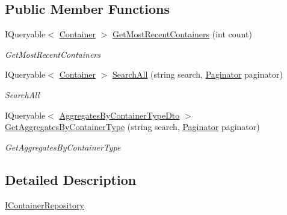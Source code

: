\subsection*{Public Member Functions}
\begin{DoxyCompactItemize}
\item 
I\+Queryable$<$ \mbox{\hyperlink{class_gtd_app_1_1_data_1_1_container}{Container}} $>$ \mbox{\hyperlink{interface_gtd_app_1_1_repository_1_1_interfaces_1_1_i_container_repository_ab1ca01a7ba1394f3a611fee57dc12646}{Get\+Most\+Recent\+Containers}} (int count)
\begin{DoxyCompactList}\small\item\em Get\+Most\+Recent\+Containers \end{DoxyCompactList}\item 
I\+Queryable$<$ \mbox{\hyperlink{class_gtd_app_1_1_data_1_1_container}{Container}} $>$ \mbox{\hyperlink{interface_gtd_app_1_1_repository_1_1_interfaces_1_1_i_container_repository_aa62fa4de64e7fa030d12aa6916d8231c}{Search\+All}} (string search, \mbox{\hyperlink{class_gtd_app_1_1_repository_1_1_paginator}{Paginator}} paginator)
\begin{DoxyCompactList}\small\item\em Search\+All \end{DoxyCompactList}\item 
I\+Queryable$<$ \mbox{\hyperlink{class_gtd_app_1_1_data_1_1_dto_1_1_aggregates_by_container_type_dto}{Aggregates\+By\+Container\+Type\+Dto}} $>$ \mbox{\hyperlink{interface_gtd_app_1_1_repository_1_1_interfaces_1_1_i_container_repository_a037098c03283c1907e38a7dbcc8a85f4}{Get\+Aggregates\+By\+Container\+Type}} (string search, \mbox{\hyperlink{class_gtd_app_1_1_repository_1_1_paginator}{Paginator}} paginator)
\begin{DoxyCompactList}\small\item\em Get\+Aggregates\+By\+Container\+Type \end{DoxyCompactList}\end{DoxyCompactItemize}


\subsection{Detailed Description}
\mbox{\hyperlink{interface_gtd_app_1_1_repository_1_1_interfaces_1_1_i_container_repository}{I\+Container\+Repository}} 




